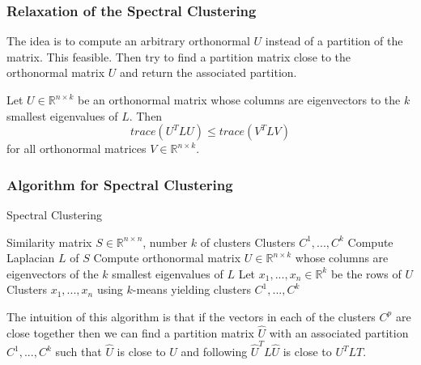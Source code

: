 \documentclass{panikzettel}
\begin{document}
\subsubsection{Relaxation of the Spectral Clustering}
\begin{halfboxl}
\vspace{-\baselineskip}
	The idea is to compute an arbitrary orthonormal $U$ instead of a partition of the matrix. This feasible. Then try to find a partition matrix close to the orthonormal matrix $U$ and return the associated partition.
\end{halfboxl}
\begin{halfboxr}
\vspace{-\baselineskip}
	\begin{theo}{}
	Let $U\in\mathbb{R}^{n\times k}$ be an orthonormal matrix whose columns are eigenvectors to the $k$ smallest eigenvalues of $L$. Then
	\[
	trace(U^TLU)\leq trace(V^TLV)
	\]
	for all orthonormal matrices $V\in \mathbb{R}^{n\times k}$.
	\end{theo}
\end{halfboxr}

\subsubsection{Algorithm for Spectral Clustering}

\begin{halfboxl}
\vspace{-\baselineskip}
	\begin{algo}{Spectral Clustering}
	{
	\renewcommand{\algorithmicrequire}{\textbf{Input:}}
	\renewcommand{\algorithmicensure}{\textbf{Output:}}
	  \begin{algorithmic}[1]
	  \Require Similarity matrix $S\in\mathbb{R}^{n\times n}$, number $k$ of clusters
	  \Ensure Clusters $C^1,...,C^k$
	  \State Compute Laplacian $L$ of $S$
	  \State Compute orthonormal matrix $U\in\mathbb{R}^{n\times k}$ whose columns are eigenvectors of the $k$ smallest eigenvalues of $L$
	  \State Let $x_1,...,x_n\in\mathbb{R}^k$ be the rows of $U$
	  \State Clusters $x_1,...,x_n$ using $k$-means yielding clusters $C^1,...,C^k$
	  \end{algorithmic}
	}
	\end{algo}
\end{halfboxl}
\begin{halfboxr}
\vspace{-\baselineskip}
	The intuition of this algorithm is that if the vectors in each of the clusters $C^p$ are close together then we can find a partition matrix $\widehat{U}$ with an associated partition $C^1,...,C^k$ such that $\widehat{U}$ is close to $U$ and following $\widehat{U}^TL\widehat{U}$ is close to $U^TLT$.
\end{halfboxr}
\end{document}
